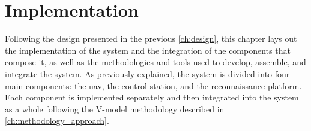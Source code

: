 \chapter{Implementation}\label{ch:implementation}

Following the design presented in the previous \cref{ch:design}, this chapter lays out the implementation of the system and the integration of the components that compose it, as well as the methodologies and tools used to develop, assemble, and integrate the system. As previously explained, the system is divided into four main components: the \gls{uav}, the control station, and the reconnaissance platform. Each component is implemented separately and then integrated into the system as a whole following the V-model methodology described in \cref{ch:methodology_approach}.






